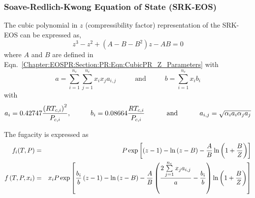 \subsubsection{Soave-Redlich-Kwong Equation of State (SRK-EOS)}\label{Chapter:Hydrate:Section:FugacityModels:Section:L_V:Section:SRKEOS}
The cubic polynomial in $z$ (compressibility factor) representation of the SRK-EOS can be expressed as,
   \begin{equation}
      z^{3} - z^{2} + \left(A-B-B^{2}\right)z - AB = 0 \label{Chapter:Hydrate:Section:FugacityModels:Section:L_V:Section:SRKEOS:Eqn:SRKEOS}
   \end{equation}
where $A$ and $B$ are defined in Eqn.~\ref{Chapter:EOSPR:Section:PR:Eqn:CubicPR_Z_Parameters} with
   \begin{displaymath}
      a = \sum\limits_{i=1}^{n_{c}}\sum\limits_{j=1}^{n_{c}}x_{i}x_{j}a_{i,j} \hspace{1cm}\text{ and }\hspace{1cm} b = \sum\limits_{i=1}^{n_{c}}x_{i}b_{i}
   \end{displaymath}
with
   \begin{displaymath}
      a_{i}=0.42747\displaystyle\frac{\left(RT_{c,i}\right)^{2}}{P_{c,i}}, \hspace{1cm} b_{i}=0.08664\displaystyle\frac{RT_{c,i}}{P_{c,i}}\hspace{1cm}\text{ and }\hspace{1cm}a_{i,j} = \sqrt{\alpha_{i}a_{i}\alpha_{j}a_{j}}
   \end{displaymath}

The fugacity is  expressed as 
   \begin{eqnarray}
      f_{i}(T,P) &=& P\exp{\left[\left(z-1\right)-\ln{\left(z-B\right)}-\displaystyle\frac{A}{B}\ln{\left(1+\displaystyle\frac{B}{Z}\right)}\right]}  \\
      f\left(T,P,x_{i}\right) &=& x_{i}P\exp{\left[\displaystyle\frac{b_{i}}{b}\left(z-1\right)-\ln{\left(z-B\right)}-\displaystyle\frac{A}{B}\left(\displaystyle\frac{2\sum\limits_{j=1}^{n_{c}}x_{j}a_{i,j}}{a}-\displaystyle\frac{b_{i}}{b}\right)\ln{\left(1+\displaystyle\frac{B}{Z}\right)}\right]} 
   \end{eqnarray}

